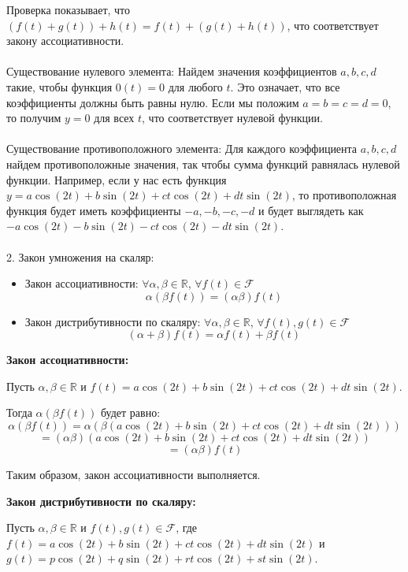 \documentclass{article}
\begin{document}
       Проверка показывает, что \((f(t) + g(t)) + h(t) = f(t) + (g(t) + h(t))\), что соответствует закону ассоциативности.
       \\ \\
       Существование нулевого элемента: Найдем значения коэффициентов \(a, b, c, d\) такие, чтобы функция \(0(t) = 0\) для любого \(t\). Это означает, что все коэффициенты должны быть равны нулю.
       Если мы положим \(a = b = c = d = 0\), то получим \(y = 0\) для всех \(t\), что соответствует нулевой функции.
       \\ \\
     Существование противоположного элемента: Для каждого коэффициента \(a, b, c, d\) найдем противоположные значения, так чтобы сумма функций равнялась нулевой функции.
       Например, если у нас есть функция \(y = a \cos(2t) + b \sin(2t) + c t \cos(2t) + d t \sin(2t)\), то противоположная функция будет иметь коэффициенты \(-a, -b, -c, -d\) и будет выглядеть как \(-a \cos(2t) - b \sin(2t) - c t \cos(2t) - d t \sin(2t)\).
\\ \\
  2. Закон умножения на скаляр:\\
\begin{itemize}
  \item Закон ассоциативности: $\forall \alpha, \beta \in \mathbb{R}$, $\forall f(t) \in \mathcal{F}$
  \[
  \alpha (\beta f(t)) = (\alpha \beta) f(t)
  \]
  
  \item Закон дистрибутивности по скаляру: $\forall \alpha, \beta \in \mathbb{R}$, $\forall f(t), g(t) \in \mathcal{F}$
  \[
  (\alpha + \beta) f(t) = \alpha f(t) + \beta f(t)
  \]
\end{itemize}

\textbf{Закон ассоциативности:}

Пусть $\alpha, \beta \in \mathbb{R}$ и $f(t) = a\cos(2t) + b\sin(2t) + ct\cos(2t) + dt\sin(2t)$.

Тогда $\alpha (\beta f(t))$ будет равно:
\[
\alpha (\beta f(t)) = \alpha \left(\beta (a\cos(2t) + b\sin(2t) + ct\cos(2t) + dt\sin(2t))\right)
\]
\[
= (\alpha \beta) (a\cos(2t) + b\sin(2t) + ct\cos(2t) + dt\sin(2t))
\]
\[
= (\alpha \beta) f(t)
\]

Таким образом, закон ассоциативности выполняется.

\textbf{Закон дистрибутивности по скаляру:}

Пусть $\alpha, \beta \in \mathbb{R}$ и $f(t), g(t) \in \mathcal{F}$, где $f(t) = a\cos(2t) + b\sin(2t) + ct\cos(2t) + dt\sin(2t)$ и $g(t) = p\cos(2t) + q\sin(2t) + rt\cos(2t) + st\sin(2t)$.
\end{document}

